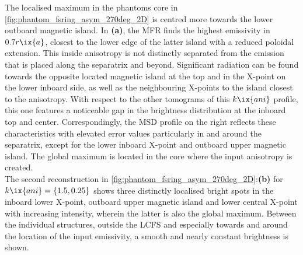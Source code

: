                 The localised maximum in the phantoms core in \cref{fig:phantom_fsring_asym_270deg_2D} is centred more towards the lower outboard magnetic island. In \textbf{(a)}, the MFR finds the highest emissivity in $0.7r\ix{a}$, closest to the lower edge of the latter island with a reduced poloidal extension. This inside anisotropy is not distinctly separated from the emission that is placed along the separatrix and beyond. Significant radiation can be found towards the opposite located magnetic island at the top and in the X-point on the lower inboard side, as well as the neighbouring X-points to the island closest to the anisotropy. With respect to the other tomograms of this $k\ix{ani}$ profile, this one features a noticeable gap in the brightness distribution at the inboard top and center. Correspondingly, the MSD profile on the right reflects these characteristics with elevated error values particularly in and around the separatrix, except for the lower inboard X-point and outboard upper magnetic island. The global maximum is located in the core where the input anisotropy is created.\\%
                The second reconstruction in \cref{fig:phantom_fsring_asym_270deg_2D}:\textbf{(b)} for $k\ix{ani}=\left\{1.5, 0.25\right\}$ shows three distinctly localised bright spots in the inboard lower X-point, outboard upper magnetic island and lower central X-point with increasing intensity, wherein the latter is also the global maximum. Between the individual structures, outside the LCFS and especially towards and around the location of the input emissivity, a smooth and nearly constant brightness is shown.\\%
%
